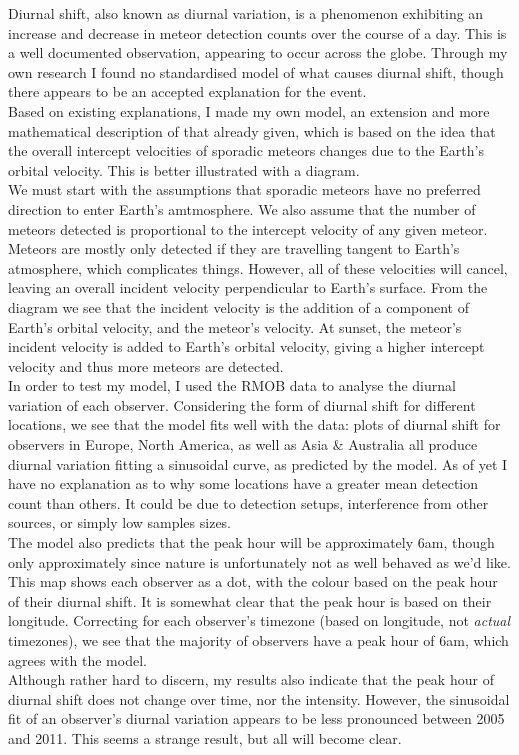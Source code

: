 \documentclass[12pt]{article}
\begin{document}
\large{
Diurnal shift, also known as diurnal variation, is a phenomenon exhibiting an
increase and decrease in meteor detection counts over the course of a day. This
is a well documented observation, appearing to occur across the globe. Through
my own research I found no standardised model of what causes diurnal shift,
though there appears to be an accepted explanation for the event.\\

Based on existing explanations, I made my own model, an extension and more
mathematical description of that already given, which is based on the idea that
the overall intercept velocities of sporadic meteors changes due to the Earth's
orbital velocity. This is better illustrated with a diagram. \\

We must start with the assumptions that sporadic meteors have no preferred
direction to enter Earth's amtmosphere. We also assume that the number of
meteors detected is proportional to the intercept velocity of any given meteor.
Meteors are mostly only detected if they are travelling tangent to Earth's
atmosphere, which complicates things. However, all of these velocities will
cancel, leaving an overall incident velocity perpendicular to Earth's surface.
From the diagram we see that the incident velocity is the addition of a
component of Earth's orbital velocity, and the meteor's velocity. At sunset,
the meteor's incident velocity is added to Earth's orbital velocity, giving a
higher intercept velocity and thus more meteors are detected.\\ 

In order to test my model, I used the RMOB data to analyse the diurnal
variation of each observer. Considering the form of diurnal shift for different
locations, we see that the model fits well with the data: plots of diurnal
shift for observers in Europe, North America, as well as Asia \& Australia all
produce diurnal variation fitting a sinusoidal curve, as predicted by the
model. As of yet I have no explanation as to why some locations have a greater
mean detection count than others. It could be due to detection setups,
interference from other sources, or simply low samples sizes.\\

The model also predicts that the peak hour will be approximately 6am, though
only approximately since nature is unfortunately not as well behaved as we'd
like.  This map shows each observer as a dot, with the colour based on the peak
hour of their diurnal shift. It is somewhat clear that the peak hour is based
on their longitude. Correcting for each observer's timezone (based on
longitude, not {\it actual} timezones), we see that the majority of observers
have a peak hour of 6am, which agrees with the model.\\

Although rather hard to discern, my results also indicate that the peak hour of
diurnal shift does not change over time, nor the intensity. However, the
sinusoidal fit of an observer's diurnal variation appears to be less pronounced
between 2005 and 2011. This seems a strange result, but all will become clear.
}
\end{document}
